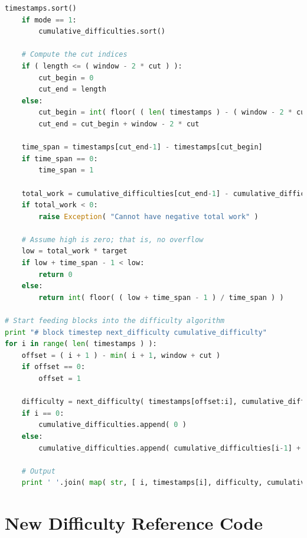 \documentclass[12pt,english]{mrl}
\theoremstyle{definition}
\numberwithin{equation}{section}
\numberwithin{figure}{section}
\numberwithin{equation}{section}
\numberwithin{equation}{section}
\numberwithin{figure}{section}
\begin{document}
\begin{appendices}
\begin{lstlisting}[language=Python,basicstyle=\small,breaklines=true]
    timestamps.sort()
    if mode == 1:
        cumulative_difficulties.sort()

    # Compute the cut indices
    if ( length <= ( window - 2 * cut ) ):
        cut_begin = 0
        cut_end = length
    else:
        cut_begin = int( floor( ( len( timestamps ) - ( window - 2 * cut ) + 1 ) / 2 ) )
        cut_end = cut_begin + window - 2 * cut

    time_span = timestamps[cut_end-1] - timestamps[cut_begin]
    if time_span == 0:
        time_span = 1

    total_work = cumulative_difficulties[cut_end-1] - cumulative_difficulties[cut_begin]
    if total_work < 0:
        raise Exception( "Cannot have negative total work" )

    # Assume high is zero; that is, no overflow
    low = total_work * target
    if low + time_span - 1 < low:
        return 0
    else:
        return int( floor( ( low + time_span - 1 ) / time_span ) )

# Start feeding blocks into the difficulty algorithm
print "# block timestep next_difficulty cumulative_difficulty"
for i in range( len( timestamps ) ):
    offset = ( i + 1 ) - min( i + 1, window + cut )
    if offset == 0:
        offset = 1

    difficulty = next_difficulty( timestamps[offset:i], cumulative_difficulties[offset:i] )
    if i == 0:
        cumulative_difficulties.append( 0 )
    else:
        cumulative_difficulties.append( cumulative_difficulties[i-1] + difficulty )

    # Output
    print ' '.join( map( str, [ i, timestamps[i], difficulty, cumulative_difficulties[i] ] ) )
\end{lstlisting}


\chapter{New Difficulty Reference Code}\label{referenceCode}

\begin{lstlisting}[language=Python,basicstyle=\small,breaklines=true]

\end{lstlisting}

\end{appendices}

\medskip{}



\end{document}
